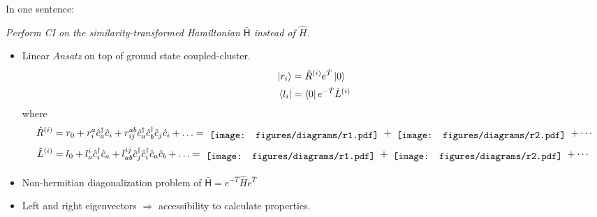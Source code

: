 In one sentence:
\begin{center}
  \textit{
  Perform \emph{CI} on the similarity-transformed Hamiltonian $\bar{\mathsf{H}}$
  instead of $\hat H$.
}
\end{center}
\begin{itemize}
  \item
    Linear \textit{Ansatz} on top of ground state coupled-cluster.
    \begin{align*}
      \left| r_i \right> &= \hat{R} ^{(i)} e^{\hat{T}} \left| 0 \right>
      \\
      \left< l_i \right| &= \left< 0 \right| e^{-\hat{T}} \hat{L}^{(i)}
    \end{align*}
    where
      \begin{align*}
        \hat{R} ^{(i)} &= r _{0}
         + r ^{a} _{i} \hat{c} ^{\dagger} _{a} \hat{c} _{i}
         + r ^{ab} _{ij} \hat{c} ^{\dagger} _{a} \hat{c} ^{\dagger} _{b}
                \hat{c} _{j} \hat{c} _{i}
         + \ldots
        =
        \tikz[baseline]\node{\texttt{[image: figures/diagrams/r1.pdf]}};
        +
        \tikz[baseline]\node{\texttt{[image: figures/diagrams/r2.pdf]}};
        +
        \cdots
        \\
        \hat{L} ^{(i)} &= l _{0}
                       + l ^{i} _{a} \hat{c} _{i}^{\dagger} \hat{c} _{a}
                       + l ^{ij} _{ab}
                          \hat{c} _{j} ^{\dagger} \hat{c} _{i}^{\dagger}
                          \hat{c} _{a} \hat{c} _{b}
                       + \ldots
        =
        \tikz[baseline]\node{\texttt{[image: figures/diagrams/r1.pdf]}};
        +
        \tikz[baseline]\node{\texttt{[image: figures/diagrams/r2.pdf]}};
        +
        \cdots
      \end{align*}

  \item
    Non-hermitian diagonalization problem of
      $ \bar{\mathsf{H}} = e^{-\hat{T}} \hat{H} e^{\hat{T}}$

  \item
    Left and right eigenvectors $ \Rightarrow $ accessibility to calculate
    properties.

\end{itemize}

